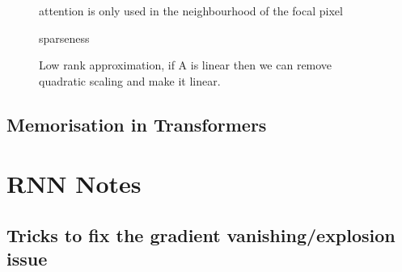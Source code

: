 \documentclass[11pt]{article}
\begin{document}
\begin{figure}[H]
    \centering
    \caption{}
\end{figure}

\begin{figure}[H]
    \centering
    \caption{attention is only used in the neighbourhood of the focal pixel}
\end{figure}

\begin{figure}[H]
    \centering
    \caption{sparseness}
\end{figure}

\begin{figure}[H]
    \centering
    \caption{Low rank approximation, if A is linear then we can remove quadratic scaling and make it linear.}
\end{figure}

\begin{figure}[H]
    \centering
    \caption{}
\end{figure}

\subsection{Memorisation in Transformers}

\begin{figure}[H]
    \centering
    \caption{}
\end{figure}

\clearpage

\appendix

\section{RNN Notes}

\subsection{Tricks to fix the gradient vanishing/explosion issue}\label{app:tricks-gradient-v/e}
\end{document}
